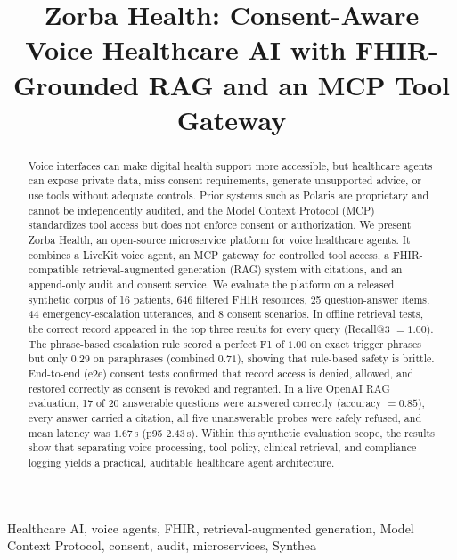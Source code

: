 \documentclass[conference]{IEEEtran}
\begin{document}
\title{Zorba Health: Consent-Aware Voice Healthcare AI with FHIR-Grounded RAG and an MCP Tool Gateway}

\author{}

\maketitle

\begin{abstract}
Voice interfaces can make digital health support more accessible, but healthcare agents can expose private data, miss consent requirements, generate unsupported advice, or use tools without adequate controls.
Prior systems such as Polaris are proprietary and cannot be independently audited, and the Model Context Protocol (MCP) standardizes tool access but does not enforce consent or authorization.
We present Zorba Health, an open-source microservice platform for voice healthcare agents.
It combines a LiveKit voice agent, an MCP gateway for controlled tool access, a FHIR-compatible retrieval-augmented generation (RAG) system with citations, and an append-only audit and consent service.
We evaluate the platform on a released synthetic corpus of 16 patients, 646 filtered FHIR resources, 25 question-answer items, 44 emergency-escalation utterances, and 8 consent scenarios.
In offline retrieval tests, the correct record appeared in the top three results for every query (Recall@3 $= 1.00$).
The phrase-based escalation rule scored a perfect F1 of $1.00$ on exact trigger phrases but only $0.29$ on paraphrases (combined $0.71$), showing that rule-based safety is brittle.
End-to-end (e2e) consent tests confirmed that record access is denied, allowed, and restored correctly as consent is revoked and regranted.
In a live OpenAI RAG evaluation, 17 of 20 answerable questions were answered correctly (accuracy $= 0.85$), every answer carried a citation, all five unanswerable probes were safely refused, and mean latency was $1.67$\,s (p95 $2.43$\,s).
Within this synthetic evaluation scope, the results show that separating voice processing, tool policy, clinical retrieval, and compliance logging yields a practical, auditable healthcare agent architecture.
\end{abstract}

\begin{IEEEkeywords}
Healthcare AI, voice agents, FHIR, retrieval-augmented generation, Model Context Protocol, consent, audit, microservices, Synthea
\end{IEEEkeywords}
\end{document}
